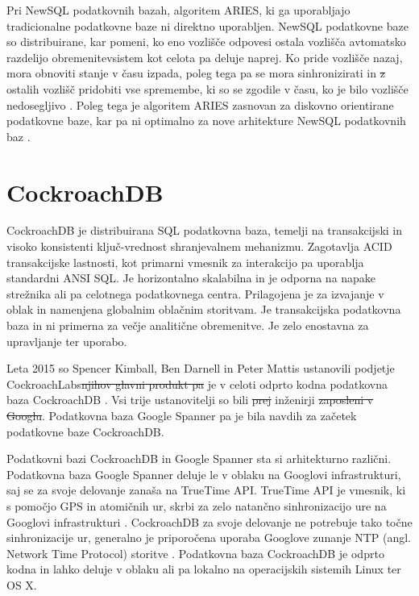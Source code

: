 \documentclass[a4paper, 12pt]{book}
\providecommand{\DIFaddtex}[1]{{\protect\color{blue}\uwave{#1}}} %
\providecommand{\DIFdeltex}[1]{{\protect\color{red}\sout{#1}}}                      %
\providecommand{\DIFaddbegin}{} %
\providecommand{\DIFaddend}{} %
\providecommand{\DIFdelbegin}{} %
\providecommand{\DIFdelend}{} %
\providecommand{\DIFadd}[1]{\texorpdfstring{\DIFaddtex{#1}}{#1}} %
\providecommand{\DIFdel}[1]{\texorpdfstring{\DIFdeltex{#1}}{}} %
\newcommand{\DIFscaledelfig}{0.5}
\newlength{\DIFdelgraphicswidth} %
\newlength{\DIFdelgraphicsheight} %
\newcommand{\DIFaddincludegraphics}[2][]{{\color{blue}\fbox{\DIFOincludegraphics[#1]{#2}}}} %
\newcommand{\DIFdelincludegraphics}[2][]{%
\sbox{\DIFdelgraphicsbox}{\DIFOincludegraphics[#1]{#2}}%
\settoboxwidth{\DIFdelgraphicswidth}{\DIFdelgraphicsbox} %
\settoboxtotalheight{\DIFdelgraphicsheight}{\DIFdelgraphicsbox} %
\scalebox{\DIFscaledelfig}{%
\parbox[b]{\DIFdelgraphicswidth}{\usebox{\DIFdelgraphicsbox}\\[-\baselineskip] \rule{\DIFdelgraphicswidth}{0em}}\llap{\resizebox{\DIFdelgraphicswidth}{\DIFdelgraphicsheight}{%
\setlength{\unitlength}{\DIFdelgraphicswidth}%
\begin{picture}(1,1)%
\thicklines\linethickness{2pt} %
{\color[rgb]{1,0,0}\put(0,0){\framebox(1,1){}}}%
{\color[rgb]{1,0,0}\put(0,0){\line( 1,1){1}}}%
{\color[rgb]{1,0,0}\put(0,1){\line(1,-1){1}}}%
\end{picture}%
}\hspace*{3pt}}} %
} %
\DeclareRobustCommand{\DIFaddbegin}{\DIFOaddbegin \let\includegraphics\DIFaddincludegraphics} %
\DeclareRobustCommand{\DIFaddend}{\DIFOaddend \let\includegraphics\DIFOincludegraphics} %
\DeclareRobustCommand{\DIFdelbegin}{\DIFOdelbegin \let\includegraphics\DIFdelincludegraphics} %
\DeclareRobustCommand{\DIFdelend}{\DIFOaddend \let\includegraphics\DIFOincludegraphics} %
\begin{document}
Pri NewSQL podatkovnih bazah, algoritem ARIES, ki ga uporabljajo tradicionalne podatkovne baze ni direktno uporabljen. NewSQL podatkovne baze so distribuirane, kar pomeni, ko eno vozlišče odpove\DIFaddbegin \DIFadd{, }\DIFaddend si ostala vozlišča avtomatsko razdelijo obremenitev\DIFaddbegin \DIFadd{, }\DIFaddend sistem kot celota pa deluje naprej. Ko pride vozlišče nazaj, mora obnoviti stanje v času izpada, poleg tega pa se mora sinhronizirati in \DIFdelbegin \DIFdel{z }\DIFdelend \DIFaddbegin \DIFadd{iz }\DIFaddend ostalih vozlišč pridobiti vse spremembe, ki so se zgodile v času, ko je bilo vozlišče nedosegljivo \cite{Pavlo2016Sep}. Poleg tega je algoritem ARIES zasnovan za diskovno orientirane podatkovne baze, kar pa ni optimalno za nove arhitekture NewSQL podatkovnih baz \cite{zheng2014fast}.




\chapter{CockroachDB}

CockroachDB je distribuirana SQL podatkovna baza, temelji na transakcijski in visoko konsistenti ključ-vrednost shranjevalnem mehanizmu. Zagotavlja ACID transakcijske lastnosti, kot primarni vmesnik za interakcijo pa uporablja standardni ANSI SQL. Je horizontalno skalabilna in je odporna na napake strežnika ali pa celotnega podatkovnega centra. Prilagojena je za izvajanje v oblak in namenjena globalnim oblačnim storitvam. Je transakcijska podatkovna baza in ni primerna za večje analitične obremenitve. Je zelo enostavna za upravljanje ter uporabo. \cite{CRDB-FAQ}

Leta 2015 so Spencer Kimball, Ben Darnell in Peter Mattis ustanovili podjetje CockroachLabs\DIFdelbegin \DIFdel{njihov glavni produkt pa }\DIFdelend \DIFaddbegin \DIFadd{. Njihov glavni produkt }\DIFaddend je v celoti odprto kodna podatkovna baza CockroachDB \cite{cockroachdb/cockroach}. Vsi trije ustanovitelji so bili \DIFdelbegin \DIFdel{prej }\DIFdelend \DIFaddbegin \DIFadd{predhodno }\DIFaddend inženirji \DIFdelbegin \DIFdel{zaposleni v Googlu}\DIFdelend \DIFaddbegin \DIFadd{v podjetju Google}\DIFaddend . Podatkovna baza Google Spanner pa je bila navdih za začetek podatkovne baze CockroachDB. \cite{CRDB-2017}

Podatkovni bazi CockroachDB in Google Spanner sta si arhitekturno različni. Podatkovna baza Google Spanner deluje le v oblaku na Googlovi infrastrukturi, saj se za svoje delovanje zanaša na TrueTime API. TrueTime API je vmesnik, ki s pomočjo GPS in atomičnih ur, skrbi za zelo natančno sinhronizacijo ure na Googlovi infrastrukturi \cite{Corbett:2013:SGG:2518037.2491245}. CockroachDB za svoje delovanje ne potrebuje tako točne sinhronizacije ur, generalno je priporočena uporaba Googlove zunanje NTP (angl. Network Time Protocol) storitve \cite{CRDB-ntpd-configuration}. Podatkovna baza CockroachDB je odprto kodna in lahko deluje v oblaku ali pa lokalno na operacijskih sistemih Linux ter OS X.
\end{document}
